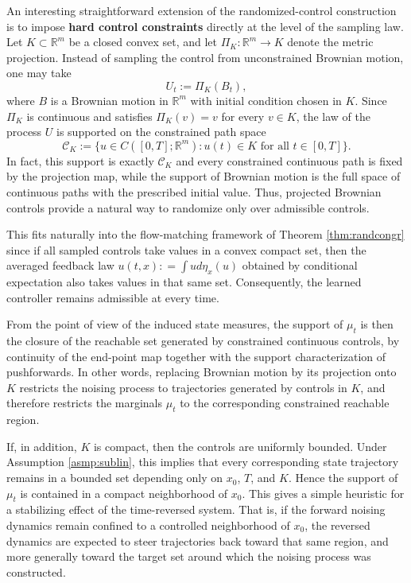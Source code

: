 \documentclass{article}
\begin{document}
An interesting straightforward extension of the randomized-control construction is to impose \textbf{hard control constraints} directly at the level of the sampling law. Let $K \subset \mathbb R^m$ be a closed convex set, and let $\Pi_K : \mathbb R^m \to K$ denote the metric projection. Instead of sampling the control from unconstrained Brownian motion, one may take
\[
U_t := \Pi_K(B_t),
\]
where $B$ is a Brownian motion in $\mathbb R^m$ with initial condition chosen in $K$. Since $\Pi_K$ is continuous and satisfies $\Pi_K(v)=v$ for every $v\in K$, the law of the process $U$ is supported on the constrained path space
\[
\mathcal C_K := \{u \in C([0,T];\mathbb R^m) : u(t)\in K \text{ for all } t\in[0,T]\}.
\]
In fact, this support is exactly $\mathcal C_K$ and every constrained continuous path is fixed by the projection map, while the support of Brownian motion is the full space of continuous paths with the prescribed initial value. Thus, projected Brownian controls provide a natural way to randomize only over admissible controls.

This fits naturally into the flow-matching framework of Theorem \ref{thm:randcongr} since if all sampled controls take values in a convex compact set, then the averaged feedback law $u(t,x) : =\int ud\eta_x (u)$ obtained by conditional expectation also takes values in that same set. Consequently, the learned controller remains admissible at every time.

From the point of view of the induced state measures, the support of $\mu_t$ is then the closure of the reachable set generated by constrained continuous controls, by continuity of the end-point map together with the support characterization of pushforwards. In other words, replacing Brownian motion by its projection onto $K$ restricts the noising process to trajectories generated by controls in $K$, and therefore restricts the marginals $\mu_t$ to the corresponding constrained reachable region.

If, in addition, $K$ is compact, then the controls are uniformly bounded. Under Assumption \ref{asmp:sublin}, this implies that every corresponding state trajectory remains in a bounded set depending only on $x_0$, $T$, and $K$. Hence the support of $\mu_t$ is contained in a compact neighborhood of $x_0$. This gives a simple heuristic for a stabilizing effect of the time-reversed system. That is, if the forward noising dynamics remain confined to a controlled neighborhood of $x_0$, the reversed dynamics are expected to steer trajectories back toward that same region, and more generally toward the target set around which the noising process was constructed. 
\end{document}
